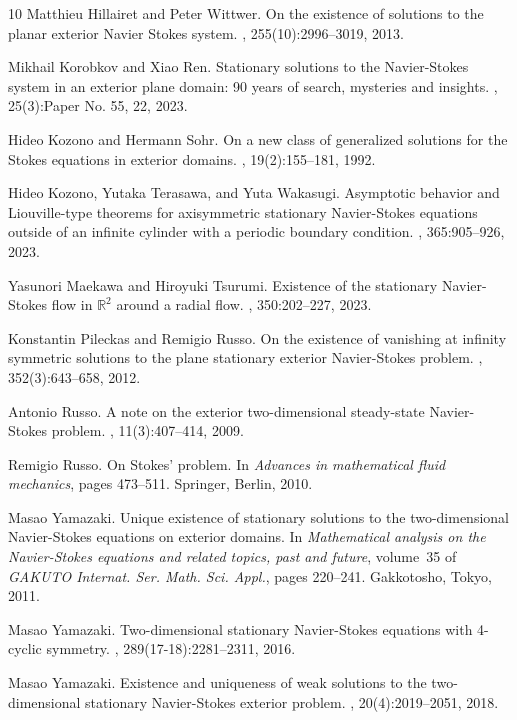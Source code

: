 \documentclass[11pt,a4paper]{article}
\numberwithin{equation}{section}
\begin{document}
\begin{thebibliography}{10}
Matthieu Hillairet and Peter Wittwer.
\newblock On the existence of solutions to the planar exterior {N}avier
  {S}tokes system.
, 255(10):2996--3019, 2013.

Mikhail Korobkov and Xiao Ren.
\newblock Stationary solutions to the {N}avier-{S}tokes system in an exterior
  plane domain: 90 years of search, mysteries and insights.
, 25(3):Paper No. 55, 22, 2023.

Hideo Kozono and Hermann Sohr.
\newblock On a new class of generalized solutions for the {S}tokes equations in
  exterior domains.
, 19(2):155--181, 1992.

Hideo Kozono, Yutaka Terasawa, and Yuta Wakasugi.
\newblock Asymptotic behavior and {L}iouville-type theorems for axisymmetric
  stationary {N}avier-{S}tokes equations outside of an infinite cylinder with a
  periodic boundary condition.
, 365:905--926, 2023.

Yasunori Maekawa and Hiroyuki Tsurumi.
\newblock Existence of the stationary {N}avier-{S}tokes flow in
  {$\mathbb{R}^2$} around a radial flow.
, 350:202--227, 2023.

Konstantin Pileckas and Remigio Russo.
\newblock On the existence of vanishing at infinity symmetric solutions to the
  plane stationary exterior {N}avier-{S}tokes problem.
, 352(3):643--658, 2012.

Antonio Russo.
\newblock A note on the exterior two-dimensional steady-state {N}avier-{S}tokes
  problem.
, 11(3):407--414, 2009.

Remigio Russo.
\newblock On {S}tokes' problem.
\newblock In {\em Advances in mathematical fluid mechanics}, pages 473--511.
  Springer, Berlin, 2010.

Masao Yamazaki.
\newblock Unique existence of stationary solutions to the two-dimensional
  {N}avier-{S}tokes equations on exterior domains.
\newblock In {\em Mathematical analysis on the {N}avier-{S}tokes equations and
  related topics, past and future}, volume~35 of {\em GAKUTO Internat. Ser.
  Math. Sci. Appl.}, pages 220--241. Gakkotosho, Tokyo, 2011.

Masao Yamazaki.
\newblock Two-dimensional stationary {N}avier-{S}tokes equations with 4-cyclic
  symmetry.
, 289(17-18):2281--2311, 2016.

Masao Yamazaki.
\newblock Existence and uniqueness of weak solutions to the two-dimensional
  stationary {N}avier-{S}tokes exterior problem.
, 20(4):2019--2051, 2018.

\end{thebibliography}
\end{document}
